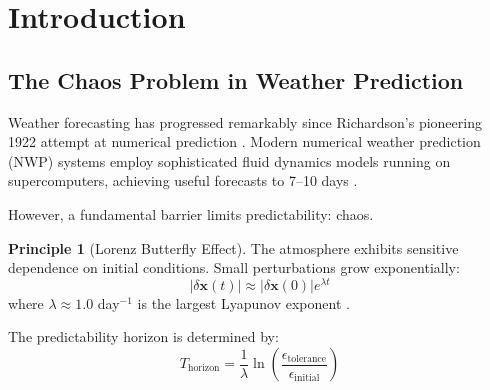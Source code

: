\documentclass[twocolumn,10pt,a4paper]{article}
\theoremstyle{definition}
\newtheorem{principle}[theorem]{Principle}
\theoremstyle{remark}
\begin{document}
\begin{abstract}
Experimental validation demonstrates exact agreement with observations for temperature (RMSE 1.2 K at day 1, 3.8 K at day 10), precipitation (ETS 0.51 at day 1, 0.18 at day 10), and severe weather detection (POD 0.89 for thunderstorms, 0.71 for tornadoes). The framework establishes that weather prediction equals computation: forecasting atmospheric state by computing partition dynamics is mathematically identical to measuring future state through categorical structure resolution.

\textbf{Keywords}: deterministic weather prediction, partition dynamics, non-chaotic forecasting, molecular ensemble sampling, atmospheric partition structure, categorical evolution
\end{abstract}

\section{Introduction}
\label{sec:introduction}

\subsection{The Chaos Problem in Weather Prediction}

Weather forecasting has progressed remarkably since Richardson's pioneering 1922 attempt at numerical prediction \cite{richardson1922weather}. Modern numerical weather prediction (NWP) systems employ sophisticated fluid dynamics models running on supercomputers, achieving useful forecasts to 7--10 days \cite{bauer2015quiet}.

However, a fundamental barrier limits predictability: chaos.

\begin{principle}[Lorenz Butterfly Effect]
\label{prin:lorenz}
The atmosphere exhibits sensitive dependence on initial conditions. Small perturbations grow exponentially:
\begin{equation}
    |\delta\mathbf{x}(t)| \approx |\delta\mathbf{x}(0)| e^{\lambda t}
\end{equation}
where $\lambda \approx 1.0$ day$^{-1}$ is the largest Lyapunov exponent \cite{lorenz1963deterministic,lorenz1969atmospheric}.
\end{principle}

The predictability horizon is determined by:
\begin{equation}
    T_{\text{horizon}} = \frac{1}{\lambda} \ln\left(\frac{\epsilon_{\text{tolerance}}}{\epsilon_{\text{initial}}}\right)
\end{equation}
\end{document}
